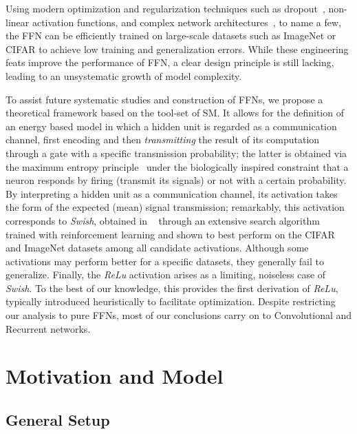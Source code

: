\documentclass{article}
\begin{document}
Using modern optimization and regularization techniques such as dropout~\cite{srivastava2014}, non-linear activation functions, and complex network architectures~\cite{Krizhevsky}, to name a few, the FFN can be efficiently trained on large-scale datasets such as ImageNet or CIFAR to achieve low training and generalization errors.
While these engineering feats improve the performance of FFN, a clear design principle is still lacking, leading to an unsystematic growth of model complexity.

To assist future systematic studies and construction of FFNs, we propose a theoretical framework based on the tool-set of SM. It allows for the definition of an energy based model in which a hidden unit is regarded as a communication channel, first encoding and then {\it transmitting} the result of its computation through a gate with a specific transmission probability;  the latter is obtained via the maximum entropy principle~\cite{zecchina, jaynes} under the biologically inspired constraint that a neuron responds by firing (transmit its signals) or not with a certain probability.
By interpreting a hidden unit as a communication channel, its activation takes the form of the expected (mean) signal transmission; remarkably, this activation corresponds to {\it Swish}, obtained in ~\cite{elfwig, prajit} through an extensive search algorithm trained with reinforcement learning and shown to best perform on the CIFAR and ImageNet datasets among all candidate activations. Although some activations may perform better for a specific datasets, they generally fail to generalize. Finally, the {\it ReLu} activation arises as a limiting, noiseless case of {\it Swish}. To the best of our knowledge, this provides the first  derivation of {\it ReLu}, typically introduced heuristically to facilitate optimization. Despite restricting our analysis to pure FFNs, most of our conclusions carry on to Convolutional and Recurrent networks.

\section{Motivation and Model} \label{sec:model}

\subsection{General Setup} \label{sub:setup}
\end{document}
